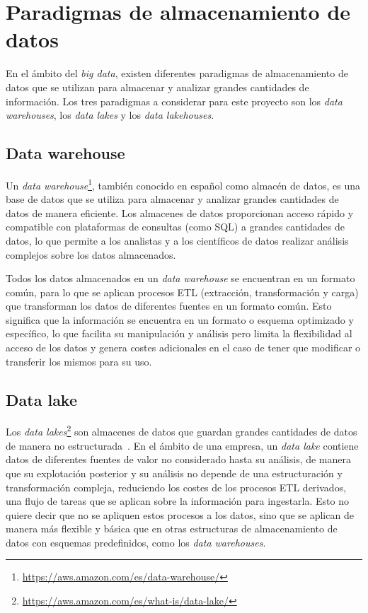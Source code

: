 \section{Paradigmas de almacenamiento de datos}\label{sec:paradigmas}
En el ámbito del \textit{big data}, existen diferentes paradigmas de almacenamiento de datos
que se utilizan para almacenar y analizar grandes cantidades de información. Los tres paradigmas
a considerar para este proyecto son los \textit{data warehouses}, los \textit{data lakes} y los
\textit{data lakehouses}.

\subsection{Data warehouse}\label{sec:warehouse}
Un \textit{data warehouse}\footnote{\url{https://aws.amazon.com/es/data-warehouse/}},
también conocido en español como almacén de datos, es una base de datos que se utiliza para
almacenar y analizar grandes cantidades de datos de manera eficiente. Los almacenes de datos
proporcionan acceso rápido y compatible con plataformas de consultas (como SQL) a grandes
cantidades de datos, lo que permite a los analistas y a los científicos de datos realizar
análisis complejos sobre los datos almacenados.

Todos los datos almacenados en un \textit{data warehouse} se encuentran en un formato común,
para lo que se aplican procesos ETL (extracción, transformación y carga) que transforman los
datos de diferentes fuentes en un formato común. Esto significa que la información se
encuentra en un formato o esquema optimizado y específico, lo que facilita su manipulación y
análisis pero limita la flexibilidad al acceso de los datos y genera costes adicionales en
el caso de tener que modificar o transferir los mismos para su uso.


\subsection{Data lake}\label{sec:lake}
Los \textit{data lakes}\footnote{\url{https://aws.amazon.com/es/what-is/data-lake/}}
son almacenes de datos que guardan grandes cantidades de datos de manera no
estructurada~\cite{mier2023dashboards}. En el ámbito de una empresa, un \textit{data lake}
contiene datos de diferentes fuentes de valor no considerado hasta su análisis, de manera
que su explotación posterior y su análisis no depende de una estructuración y transformación
compleja, reduciendo los costes de los procesos ETL derivados, una flujo de tareas que se
aplican sobre la información para ingestarla. Esto no quiere decir que no se apliquen estos
procesos a los datos, sino que se aplican de manera más flexible y básica que en otras
estructuras de almacenamiento de datos con esquemas predefinidos, como los
\textit{data warehouses}.~\cite{pwint2018data}

